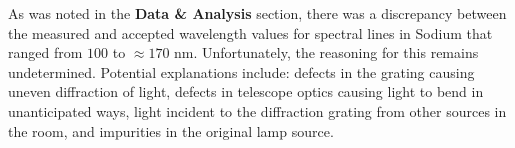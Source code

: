\documentclass[paper=a4, fontsize=11pt]{scrartcl} %
\numberwithin{equation}{section}
\numberwithin{figure}{section}
\numberwithin{table}{section}
\begin{document}
As was noted in the \textbf{Data \& Analysis} section, there was a discrepancy between the measured and accepted wavelength values for spectral lines in Sodium that ranged from $100$ to $\approx 170$ nm. Unfortunately, the reasoning for this remains undetermined. Potential explanations include: defects in the grating causing uneven diffraction of light, defects in telescope optics causing light to bend in unanticipated ways, light incident to the diffraction grating from other sources in the room, and impurities in the original lamp source.






\end{document}

